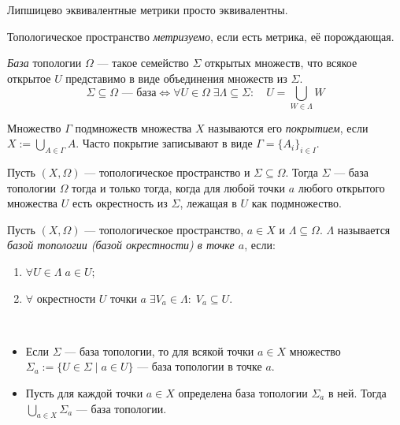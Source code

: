 \documentclass[12pt,a4paper]{article}
\begin{document}
    \begin{theorem}
        Липшицево эквивалентные метрики просто эквивалентны.
    \end{theorem}

    \begin{definition}
        Топологическое пространство \emph{метризуемо}, если есть метрика, её порождающая.
    \end{definition}

    \begin{definition}
        \emph{База} топологии $\Omega$ --- такое семейство $\Sigma$ открытых множеств, что всякое открытое $U$ представимо в виде объединения множеств из $\Sigma$.
        \[\Sigma \subseteq \Omega\text{ --- база} \Longleftrightarrow \forall U \in \Omega\; \exists \Lambda \subseteq \Sigma:\quad U = \bigcup_{W \in \Lambda} W\]
    \end{definition}

    \begin{definition}
        Множество $\Gamma$ подмножеств множества $X$ называются его \emph{покрытием}, если $X := \bigcup_{A \in \Gamma} A$. Часто покрытие записывают в виде $\Gamma = \{A_i\}_{i \in I}$.
    \end{definition}

    \begin{theorem}
        Пусть $(X, \Omega)$ --- топологическое пространство и $\Sigma \subseteq \Omega$. Тогда $\Sigma$ --- база топологии $\Omega$ тогда и только тогда, когда для любой точки $a$ любого открытого множества $U$ есть окрестность из $\Sigma$, лежащая в $U$ как подмножество.
    \end{theorem}

    \begin{definition}
        Пусть $(X, \Omega)$ --- топологическое пространство, $a \in X$ и $\Lambda \subseteq \Omega$. $\Lambda$ называется \emph{базой топологии (базой окрестности) в точке $a$}, если:
        \begin{enumerate}
            \item $\forall U \in \Lambda\; a \in U$;
            \item $\forall\text{ окрестности }U\text{ точки }a\; \exists V_a \in \Lambda:\; V_a \subseteq U$.
        \end{enumerate}
    \end{definition}

    \begin{theorem}\ 
        \begin{itemize}
            \item Если $\Sigma$ --- база топологии, то для всякой точки $a \in X$ множество $\Sigma_a := \{U \in \Sigma \mid a \in U\}$ --- база топологии в точке $a$.
            \item Пусть для каждой точки $a \in X$ определена база топологии $\Sigma_a$ в ней. Тогда $\bigcup_{a \in X} \Sigma_a$ --- база топологии.
        \end{itemize}
    \end{theorem}
\end{document}
